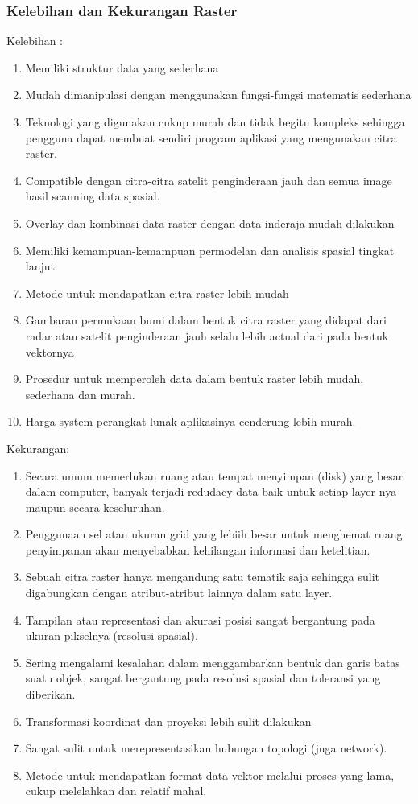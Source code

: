 \subsubsection{Kelebihan dan Kekurangan Raster}
 Kelebihan :
 \begin{enumerate}
    \item Memiliki struktur data yang sederhana
    \item Mudah dimanipulasi dengan menggunakan fungsi-fungsi matematis sederhana
    \item Teknologi yang digunakan cukup murah dan tidak begitu kompleks sehingga pengguna dapat 
             membuat sendiri program aplikasi yang mengunakan citra raster.
    \item Compatible dengan citra-citra satelit penginderaan jauh dan semua image hasil scanning data spasial.
    \item Overlay dan kombinasi data raster dengan data inderaja mudah dilakukan
    \item Memiliki kemampuan-kemampuan permodelan dan analisis spasial tingkat lanjut
    \item Metode untuk mendapatkan citra raster lebih mudah
    \item Gambaran permukaan bumi dalam bentuk citra raster yang didapat dari radar atau satelit 
             penginderaan jauh selalu lebih actual dari pada bentuk vektornya
    \item Prosedur untuk memperoleh data dalam bentuk raster lebih mudah, sederhana dan murah.
    \item Harga system perangkat lunak aplikasinya cenderung lebih murah.
 \end{enumerate}
 Kekurangan:
 \begin{enumerate}
    \item Secara umum memerlukan ruang atau tempat menyimpan (disk) yang besar dalam computer, 
             banyak terjadi redudacy data baik untuk setiap layer-nya maupun secara keseluruhan.
    \item Penggunaan sel atau ukuran grid yang lebiih besar untuk menghemat ruang penyimpanan akan 
             menyebabkan kehilangan informasi dan ketelitian.
    \item Sebuah citra raster hanya mengandung satu tematik saja sehingga sulit digabungkan 
             dengan atribut-atribut lainnya dalam satu layer.
    \item Tampilan atau representasi dan akurasi posisi sangat bergantung pada ukuran pikselnya (resolusi spasial).
    \item Sering mengalami kesalahan dalam menggambarkan bentuk dan garis batas suatu objek, 
             sangat bergantung pada resolusi spasial dan toleransi yang diberikan.
    \item Transformasi koordinat dan proyeksi lebih sulit dilakukan
    \item Sangat sulit untuk merepresentasikan hubungan topologi (juga network).
    \item Metode untuk mendapatkan format data vektor melalui proses yang lama, cukup melelahkan dan relatif mahal.
  \end{enumerate}
